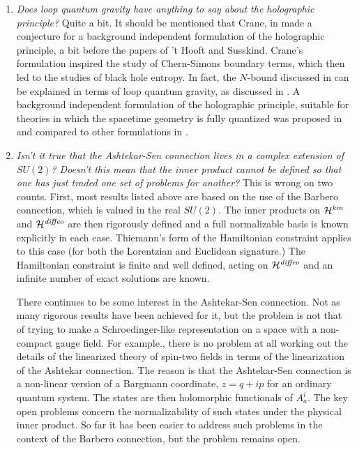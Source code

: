\documentclass[12pt]{article}
\begin{document}
\begin{enumerate}
\item{}{\it Does loop quantum gravity have anything to say about the holographic principle?}
Quite a bit. It should be mentioned that Crane, in \cite{louis-holo} made a conjecture for 
a background independent formulation of the holographic principle, a bit before the papers of 
't Hooft\cite{thooft-holo} and  Susskind\cite{lenny-holo}.  Crane's
formulation inspired the study of Chern-Simons boundary terms\cite{linking}, which then led
to the studies of black hole entropy.  In fact, the $N$-bound discussed in \cite{N-Banks} can
be explained in terms of loop quantum gravity, as discussed in \cite{positive}.  A background
independent formulation of the holographic principle, suitable for theories in which the spacetime
geometry is fully quantized was proposed in \cite{weakholo} and compared to other formulations 
in \cite{weakstrong}.  


\item{}{ \it Isn't it true that the Ashtekar-Sen connection lives in a complex extension of $SU(2)$?
Doesn't this mean that the inner product cannot be defined so that one has just traded one
set of problems for another?}  This is wrong on two counts. First, most results listed above
are based on the use of the Barbero connection, which is valued in the real $SU(2)$.  The
inner products on ${\cal H}^{\it kin}$ and ${\cal H}^{\it diffeo}$ are then rigorously defined
and a full normalizable basis is known explicitly in each case.   Thiemann's form of the 
Hamiltonian constraint applies to this case (for both the Lorentzian and Euclidean signature.) The Hamiltonian
constraint is finite and well defined, acting on ${\cal H}^{\it diffeo}$ and an infinite number
of exact solutions are known.  

There continues to be some interest in the Ashtekar-Sen connection.  Not as many rigorous
results have been achieved for it, but the problem is not that of trying to make a Schroedinger-like
representation on a space with a non-compact gauge field.  For example., there is no problem at all working out the details of the linearized theory of spin-two fields in terms of the
linearization of the Ashtekar connection\cite{gravitons,laurentlee}.  
The reason is that the Ashtekar-Sen connection is
a non-linear version of a Bargmann coordinate, $z=q+ip$ for an ordinary quantum system.
The states are then holomorphic functionals of $A_a^i$.   The key open problems concern the
normalizability of such states under the physical inner product. So far it has been easier
to address such problems in the context of the Barbero connection, but the problem 
remains open.  



\end{enumerate}
\end{document}
